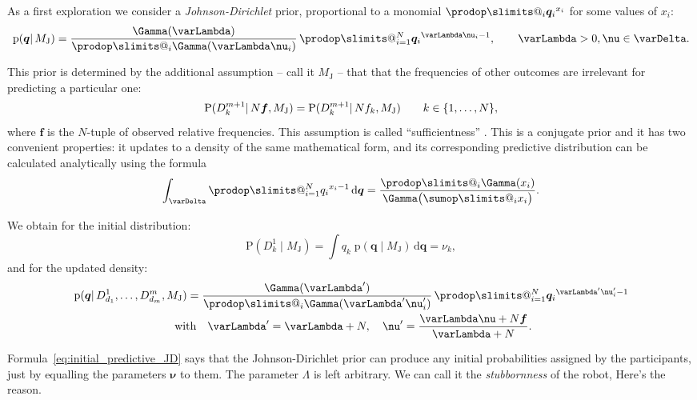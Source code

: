 \documentclass[\ifafour a4paper,12pt,\else a5paper,10pt,\fi%
onecolumn,oneside,article,%
british%
]{memoir}
\makeatletter
\theoremstyle{remark}
\theoremstyle{innote}
\def\sum{\DOTSI\sumop\slimits@}
\def\prod{\DOTSI\prodop\slimits@}
\newcommand*{\citep}{\parencites}
\newcommand*{\citey}{\parencites*}
\renewcommand*{\cites}{\parencites}
\newcommand*{\di}{\mathrm{d}}%
\DeclarePairedDelimiter\set{\{}{\}}
\newcommand*{\pf}{\mathrm{p}}%
\newcommand*{\p}{\mathrm{P}}%
\renewcommand*{\|}{\mathpunct{|}}
\newcommand*{\chap}{ch.}%
\newcommand*{\tsum}{\mathop{\textstyle\sum}\nolimits}
\newcommand*{\simpl}{\varDelta}
\newcommand*{\yqq}{q}
\newcommand*{\yq}{\bm{\yqq}}
\newcommand*{\yff}{f}
\newcommand*{\yf}{\bm{\yff}}
\newcommand*{\yMJ}{M_{\text{J}}}
\newcommand*{\yN}{\varLambda}
\newcommand*{\ynn}{\nu}
\newcommand*{\yn}{\bm{\nu}}
\makeatother
\begin{document}
As a first exploration we consider a \emph{Johnson-Dirichlet} prior,
proportional to a monomial $\prod_i{\yq_i}^{x_i}$ for some values of $x_i$:
\begin{equation}
  \label{eq:JD_prior}
  \pf(\yq \| \yMJ) =
  \frac{\Gamma(\yN)}{\prod_i \Gamma(\yN\ynn_i)}\,
  \prod_{i=1}^N{\yq_i}^{\yN\ynn_i-1}, \qquad \yN>0, \ynn \in \simpl.
\end{equation}

This prior is determined by the additional assumption -- call it $\yMJ$ --
that that the frequencies of other outcomes are irrelevant for predicting a
particular one:
\begin{equation}
  \label{eq:sufficientness}
  \p(D^{m+1}_k \| N\yf, \yMJ) = \p(D^{m+1}_k \| N\yff_{k}, \yMJ)
  \qquad k\in\set{1,\dotsc, N},
\end{equation}
where $\yf$ is the $N$-tuple of observed relative frequencies. This
assumption is called \enquote{sufficientness}
\cites{johnson1924,johnson1932c}[\chap~4]{good1965}{zabell1982,jaynes1986d_r1996}.
This is a conjugate prior
\cites[\chap~9]{degroot1970_r2004}{diaconisetal1979b} and it has two convenient
properties: it updates to a density of the same mathematical form, and its
corresponding predictive distribution can be calculated analytically using
the formula
\begin{equation}
  \label{eq:Dirichlet_formula}
  \int_{\simpl} \prod_{i=1}^N {\yqq_{i}}^{x_i-1}\,\di\yq = \frac{\prod_i \Gamma(x_i)}{\Gamma\bigl(\sum_i x_i\bigr)}.
\end{equation}

We obtain for the initial distribution:
\begin{equation}
  \label{eq:initial_predictive_JD}
  \p(D^1_{k} \| \yMJ) = \int \yqq_{k}\; \pf(\yq \| \yMJ)\,\di\yq
  = \ynn_k,
\end{equation}
and for the updated density:
\begin{multline}
  \label{eq:update_prior_JD}
  \pf(\yq \| D^1_{d_1}, \dotsc, D^m_{d_m}, \yMJ)
  = 
  \frac{\Gamma(\yN')}{\prod_i \Gamma(\yN'\ynn_i')}\,
  \prod_{i=1}^N{\yq_i}^{\yN'\ynn_i'-1}
  \\\
  \text{with}\quad \yN' =\yN+N,\quad
  \yn'=\frac{\yN\yn+N\yf}{\yN+N}.
\end{multline}

Formula~\eqref{eq:initial_predictive_JD} says that the Johnson-Dirichlet
prior can produce any initial probabilities assigned by the participants,
just by equalling the parameters $\yn$ to them. The parameter $\yN$ is left
arbitrary. We can call it the \emph{stubbornness} of the robot, Here's the reason.
\end{document}
